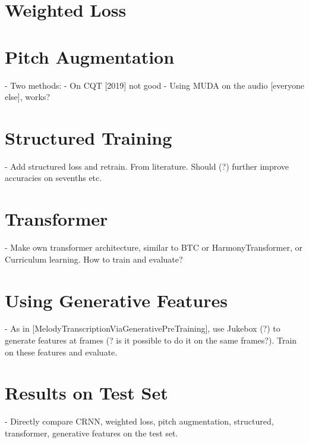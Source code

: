\section{Weighted Loss}

\section{Pitch Augmentation}
- Two methods:
- On CQT [2019] not good
- Using MUDA on the audio [everyone else], works?

\section{Structured Training}

- Add structured loss and retrain. From literature. Should (?) further improve accuracies on sevenths etc.

\section{Transformer}

- Make own transformer architecture, similar to BTC or HarmonyTransformer, or Curriculum learning. How to train and evaluate?

\section{Using Generative Features}

- As in [MelodyTranscriptionViaGenerativePreTraining], use Jukebox (?) to generate features at frames (? is it possible to do it on the same frames?). Train on these features and evaluate.

\section{Results on Test Set}

- Directly compare CRNN, weighted loss, pitch augmentation, structured, transformer, generative features on the test set.